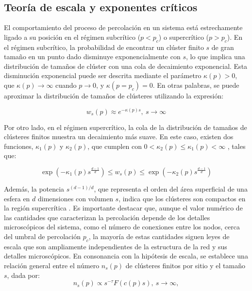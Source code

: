 \subsection{Teoría de escala y exponentes críticos}



El comportamiento del proceso de percolación en un sistema está estrechamente ligado a su posición en el régimen subcrítico ($p < p_c$) o supercrítico ($p > p_c$). En el régimen subcrítico, la probabilidad de encontrar un clúster finito $s$ de gran tamaño en un punto dado disminuye exponencialmente con $s$, lo que implica una distribución de tamaños de clúster con una cola de decaimiento exponencial. Esta disminución exponencial puede ser descrita mediante el parámetro $\kappa(p) > 0$, que $\kappa(p) \to\infty$ cuando $p\to0$, y $\kappa(p = p_c ) = 0$. En otras palabras, se puede aproximar la distribución de tamaños de clústeres utilizando la expresión:

\begin{equation}\label{eq:20}
w_s(p) \approx e^{-\kappa(p)s}, \ s\to\infty
\end{equation}

Por otro lado, en el régimen supercrítico, la cola de la distribución de tamaños de clústeres finitos muestra un decaimiento más suave. En este caso, existen dos funciones,  $\kappa_1(p)$  y $\kappa_2 (p)$, que cumplen con $0 < \kappa_2(p) \leq  \kappa_1(p) < \infty$ \cite{grimmett_percolation_2013}, tales que:

\begin{equation}\label{eq:21}
	\exp{\left(-\kappa_1(p)s^{\frac{d-1}{d}}\right)} \leq w_s(p) \leq \exp{\left(-\kappa_2(p)s^{\frac{d-1}{d}}\right)}
\end{equation}

Además, la potencia $s^{(d-1)/d}$, que representa el orden del área superficial de una esfera en $d$ dimensiones con volumen $s$, indica que los clústeres son compactos en la región supercrítica \cite{djordjevic_scaling_1987}. Es importante destacar que, aunque el valor numérico de las cantidades que caracterizan la percolación depende de los detalles microscópicos del sistema, como el número de conexiones entre los nodos, cerca del umbral de percolación $p_c$, la mayoría de estas cantidades siguen leyes de escala que son ampliamente independientes de la estructura de la red y sus detalles microscópicos. En consonancia con la hipótesis de escala, se establece una relación general entre el número $n_s(p)$ de clústeres finitos por sitio y el tamaño $s$, dada por:
\begin{equation}\label{eq:22}
	n_s(p)  \propto s^{-\tau}F\left(c(p)s\right), \ s\to\infty,
\end{equation}

